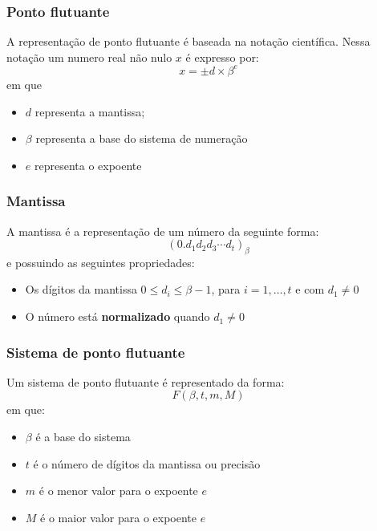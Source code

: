 \documentclass{beamer}
\begin{document}
\begin{frame}
	\frametitle{Ponto flutuante}
	A representação de ponto flutuante é baseada na notação científica. Nessa notação um numero real não nulo $ x $ é expresso por:
	\begin{equation*}
		x = \pm d \times \beta^{e}
	\end{equation*}
	em que 
	\begin{itemize}
		\item $ d $ representa a mantissa;
		\item $ \beta $ representa a base do sistema de numeração
		\item $ e $ representa o expoente
	\end{itemize}	
\end{frame}

\begin{frame}
	\frametitle{Mantissa}
	A mantissa é a representação de um número da seguinte forma:
	\begin{equation*}
		(0. d_{1} d_{2} d_{3}\cdots d_{t})_{\beta}
	\end{equation*}
	e possuindo as seguintes propriedades:
	\begin{itemize}
		\item Os dígitos da mantissa $ 0 \leq d_{i} \leq \beta - 1 $, para $ i = 1, \ldots, t $ e com $ d_{1} \neq 0 $
		\item O número está \textbf{normalizado} quando $ d_{1} \neq 0 $
	\end{itemize}
\end{frame}

\begin{frame}
	\frametitle{Sistema de ponto flutuante}
	Um sistema de ponto flutuante é representado da forma:
	\begin{equation*}
		F(\beta, t, m, M)
	\end{equation*}
	em que:
	\begin{itemize}
		\item $ \beta $ é a base do sistema
		\item $ t $ é o número de dígitos da mantissa ou precisão
		\item $ m $ é o menor valor para o expoente $ e $
		\item $ M $	é o maior valor para o expoente $ e $
	\end{itemize}
\end{frame}
\end{document}
